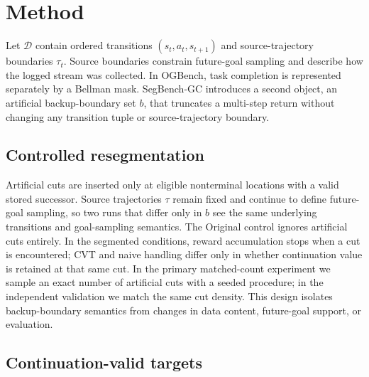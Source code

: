 \section{Method}

Let $\mathcal{D}$ contain ordered transitions $(s_t,a_t,s_{t+1})$ and source-trajectory boundaries $\tau_t$. Source boundaries constrain future-goal sampling and describe how the logged stream was collected. In OGBench, task completion is represented separately by a Bellman mask. SegBench-GC introduces a second object, an artificial backup-boundary set $b$, that truncates a multi-step return without changing any transition tuple or source-trajectory boundary.

\subsection{Controlled resegmentation}

Artificial cuts are inserted only at eligible nonterminal locations with a valid stored successor. Source trajectories $\tau$ remain fixed and continue to define future-goal sampling, so two runs that differ only in $b$ see the same underlying transitions and goal-sampling semantics. The Original control ignores artificial cuts entirely. In the segmented conditions, reward accumulation stops when a cut is encountered; CVT and naive handling differ only in whether continuation value is retained at that same cut. In the primary matched-count experiment we sample an exact number of artificial cuts with a seeded procedure; in the independent validation we match the same cut density. This design isolates backup-boundary semantics from changes in data content, future-goal support, or evaluation.

\subsection{Continuation-valid targets}

